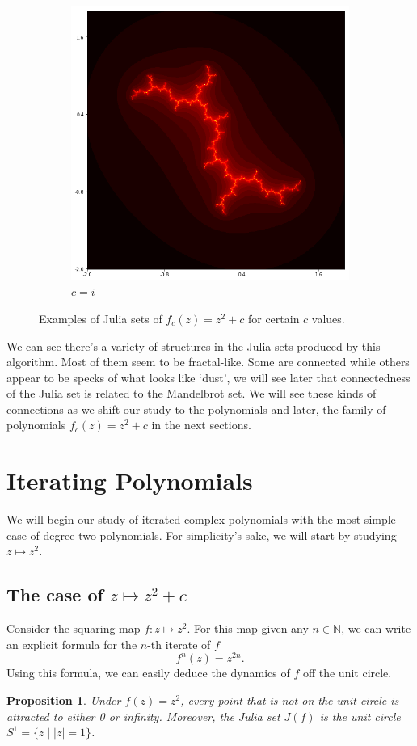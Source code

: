 \documentclass{amsart}
\newcommand{\bbN}{\mathbb{N}}
\newcommand{\abs}[1]{ \left| #1 \right| }
\newtheorem{prop}[thm]{Proposition}
\theoremstyle{definition}
\theoremstyle{remark}
\numberwithin{equation}{section}
\begin{document}
\begin{figure}[h]
\begin{subfigure}{.32\textwidth}
  \includegraphics[width=.8\linewidth]{JuliaCi.png}
  \caption{$c=i$}
\end{subfigure}
\caption{Examples of Julia sets of $f_c(z)=z^2+c$ for certain $c$ values.}
\label{fig:JuliaSetsC}
\end{figure}

We can see there's a variety of structures in the Julia sets produced by this algorithm. Most of them seem to be fractal-like. Some are connected while others appear to be specks of what looks like `dust', we will see later that connectedness of the Julia set is related to the Mandelbrot set. We will see these kinds of connections as we shift our study to the polynomials and later, the family of polynomials $f_c(z)=z^2+c$ in the next sections.

\section{Iterating Polynomials}

We will begin our study of iterated complex polynomials with the most simple case of degree two polynomials. For simplicity's sake, we will start by studying $z\mapsto z^2$.

\subsection{The case of $z\mapsto z^2+c$}

Consider the squaring map $f\colon z\mapsto z^2$. For this map given any $n\in\bbN$, we can write an explicit formula for the $n$-th iterate of $f$ \[
f^n(z)=z^{2n}.
\]
Using this formula, we can easily deduce the dynamics of $f$ off the unit circle.
\begin{prop}
Under $f(z)=z^2$, every point that is not on the unit circle is attracted to either 0 or infinity. Moreover, the Julia set $J(f)$ is the unit circle $S^1=\{z\mid \abs{z}=1\}$.
\end{prop}
\end{document}

